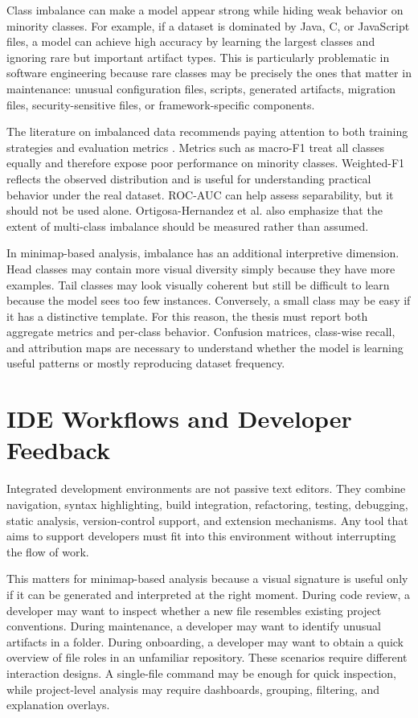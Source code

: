 Class imbalance can make a model appear strong while hiding weak behavior on
minority classes. For example, if a dataset is dominated by Java, C, or
JavaScript files, a model can achieve high accuracy by learning the largest
classes and ignoring rare but important artifact types. This is particularly
problematic in software engineering because rare classes may be precisely the
ones that matter in maintenance: unusual configuration files, scripts, generated
artifacts, migration files, security-sensitive files, or framework-specific
components.

The literature on imbalanced data recommends paying attention to both training
strategies and evaluation metrics \cite{he2009imbalance,japkowicz2002}. Metrics
such as macro-F1 treat all classes equally and therefore expose poor performance
on minority classes. Weighted-F1 reflects the observed distribution and is useful
for understanding practical behavior under the real dataset. ROC-AUC can help
assess separability, but it should not be used alone. Ortigosa-Hernandez et al.
\cite{ortigosa2017} also emphasize that the extent of multi-class imbalance
should be measured rather than assumed.

In minimap-based analysis, imbalance has an additional interpretive dimension.
Head classes may contain more visual diversity simply because they have more
examples. Tail classes may look visually coherent but still be difficult to
learn because the model sees too few instances. Conversely, a small class may be
easy if it has a distinctive template. For this reason, the thesis must report
both aggregate metrics and per-class behavior. Confusion matrices, class-wise
recall, and attribution maps are necessary to understand whether the model is
learning useful patterns or mostly reproducing dataset frequency.

\section{IDE Workflows and Developer Feedback}

Integrated development environments are not passive text editors. They combine
navigation, syntax highlighting, build integration, refactoring, testing,
debugging, static analysis, version-control support, and extension mechanisms.
Any tool that aims to support developers must fit into this environment without
interrupting the flow of work.

This matters for minimap-based analysis because a visual signature is useful
only if it can be generated and interpreted at the right moment. During code
review, a developer may want to inspect whether a new file resembles existing
project conventions. During maintenance, a developer may want to identify
unusual artifacts in a folder. During onboarding, a developer may want to obtain
a quick overview of file roles in an unfamiliar repository. These scenarios
require different interaction designs. A single-file command may be enough for
quick inspection, while project-level analysis may require dashboards, grouping,
filtering, and explanation overlays.


